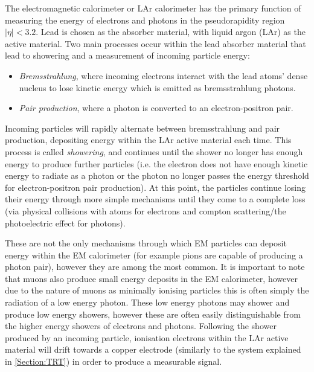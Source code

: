 \documentclass[12pt,a4paper,epsf,portrait,times,epsfig]{article}
\begin{document}
		The electromagnetic calorimeter or LAr calorimeter \cite{ATLASECalTDR} has the primary function of measuring the energy of electrons and photons in the pseudorapidity region $|\eta| < 3.2$. Lead is chosen as the absorber material, with liquid argon (LAr) as the active material. Two main processes occur within the lead absorber material that lead to showering and a measurement of incoming particle energy:
		
		\begin{itemize}
			\item \textit{Bremsstrahlung}, where incoming electrons interact with the lead atoms' dense nucleus to lose kinetic energy which is emitted as bremsstrahlung photons.
			\item \textit{Pair production}, where a photon is converted to an electron-positron pair.
		\end{itemize}

		Incoming particles will rapidly alternate between bremsstrahlung and pair production, depositing energy within the LAr active material each time. This process is called \textit{showering}, and continues until the shower no longer has enough energy to produce further particles (i.e. the electron does not have enough kinetic energy to radiate as a photon or the photon no longer passes the energy threshold for electron-positron pair production). At this point, the particles continue losing their energy through more simple mechanisms until they come to a complete loss (via physical collisions with atoms for electrons and compton scattering/the photoelectric effect for photons). \par

		These are not the only mechanisms through which EM particles can deposit energy within the EM calorimeter (for example pions are capable of producing a photon pair), however they are among the most common. It is important to note that muons also produce small energy deposits in the EM calorimeter, however due to the nature of muons as minimally ionising particles this is often simply the radiation of a low energy photon. These low energy photons may shower and produce low energy showers, however these are often easily distinguishable from the higher energy showers of electrons and photons. Following the shower produced by an incoming particle, ionisation electrons within the LAr active material will drift towards a copper electrode (similarly to the system explained in \ref{Section:TRT}) in order to produce a measurable signal. \par
		
\end{document}
